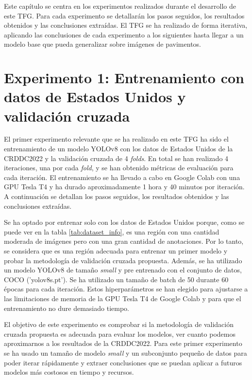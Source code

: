 
Este capítulo se centra en los experimentos realizados durante el desarrollo de este TFG. Para cada experimento se detallarán los pasos seguidos, los resultados obtenidos y las conclusiones extraídas. El TFG se ha realizado de forma iterativa, aplicando las conclusiones de cada experimento a los siguientes hasta llegar a un modelo base que pueda generalizar sobre imágenes de pavimentos.


\section{Experimento 1: Entrenamiento con datos de Estados Unidos y validación cruzada}\label{SEC:EXP1}

El primer experimento relevante que se ha realizado en este TFG ha sido el entrenamiento de un modelo YOLOv8 con los datos de Estados Unidos de la CRDDC2022 y la validación cruzada de 4 \textit{folds}. En total se han realizado 4 iteraciones, una por cada \textit{fold}, y se han obtenido métricas de evaluación para cada iteración. El entrenamiento se ha llevado a cabo en Google Colab con una GPU Tesla T4 y ha durado aproximadamente 1 hora y 40 minutos por iteración. A continuación se detallan los pasos seguidos, los resultados obtenidos y las conclusiones extraídas.

Se ha optado por entrenar solo con los datos de Estados Unidos porque, como se puede ver en la tabla \ref{tab:dataset_info}, es una región con una cantidad moderada de imágenes pero con una gran cantidad de anotaciones. Por lo tanto, se considera que es una región adecuada para entrenar un primer modelo y probar la metodología de validación cruzada propuesta. Además, se ha utilizado un modelo YOLOv8 de tamaño \textit{small} y pre entrenado con el conjunto de datos, COCO ('yolov8s.pt'). Se ha utilizado un tamaño de batch de 50 durante 60 épocas para cada iteración. Estos hiperparámetros se han elegido para ajustarse a las limitaciones de memoria de la GPU Tesla T4 de Google Colab y para que el entrenamiento no dure demasiado tiempo.

El objetivo de este experimento es comprobar si la metodología de validación cruzada propuesta es adecuada para evaluar los modelos, ver cuanto podemos aproximarnos a los resultados de la CRDDC2022. Para este primer experimento se ha usado un tamaño de modelo \textit{small} y un subconjunto pequeño de datos para poder iterar rápidamente y extraer conclusiones que se puedan aplicar a futuros modelos más costosos en tiempo y recursos.

